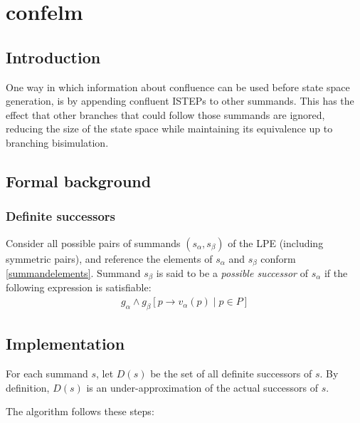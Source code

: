 \chapter{confelm}

\section{Introduction}
One way in which information about confluence can be used before state space generation, is by appending confluent ISTEPs to other summands.
This has the effect that other branches that could follow those summands are ignored, reducing the size of the state space while maintaining its equivalence up to branching bisimulation.

\section{Formal background}

\subsection{Definite successors}

Consider all possible pairs of summands $(s_\alpha, s_\beta)$ of the LPE (including symmetric pairs), and reference the elements of $s_\alpha$ and $s_\beta$ conform \ref{summandelements}.
Summand $s_\beta$ is said to be a \emph{possible successor} of $s_\alpha$ if the following expression is satisfiable:
\begin{align*}
g_\alpha \land {g_\beta}[p \rightarrow v_\alpha(p) \;|\; p \in P]
\end{align*}

\section{Implementation}

For each summand $s$, let $D(s)$ be the set of all definite successors of $s$.
By definition, $D(s)$ is an under-approximation of the actual successors of $s$.

The algorithm follows these steps:

